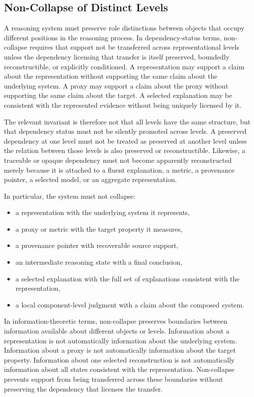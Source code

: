 \documentclass[11pt]{article}
\begin{document}
\subsection{Non-Collapse of Distinct Levels}

A reasoning system must preserve role distinctions between objects that occupy different positions in the reasoning process. In dependency-status terms, non-collapse requires that support not be transferred across representational levels unless the dependency licensing that transfer is itself preserved, boundedly reconstructible, or explicitly conditioned. A representation may support a claim about the representation without supporting the same claim about the underlying system. A proxy may support a claim about the proxy without supporting the same claim about the target. A selected explanation may be consistent with the represented evidence without being uniquely licensed by it.

The relevant invariant is therefore not that all levels have the same structure, but that dependency status must not be silently promoted across levels. A preserved dependency at one level must not be treated as preserved at another level unless the relation between those levels is also preserved or reconstructible. Likewise, a traceable or opaque dependency must not become apparently reconstructed merely because it is attached to a fluent explanation, a metric, a provenance pointer, a selected model, or an aggregate representation.

In particular, the system must not collapse:
\begin{itemize}[leftmargin=1.5em]
\item a representation with the underlying system it represents,
\item a proxy or metric with the target property it measures,
\item a provenance pointer with recoverable source support,
\item an intermediate reasoning state with a final conclusion,
\item a selected explanation with the full set of explanations consistent with the representation,
\item a local component-level judgment with a claim about the composed system.
\end{itemize}

In information-theoretic terms, non-collapse preserves boundaries between information available about different objects or levels. Information about a representation is not automatically information about the underlying system. Information about a proxy is not automatically information about the target property. Information about one selected reconstruction is not automatically information about all states consistent with the representation. Non-collapse prevents support from being transferred across these boundaries without preserving the dependency that licenses the transfer.
\end{document}
